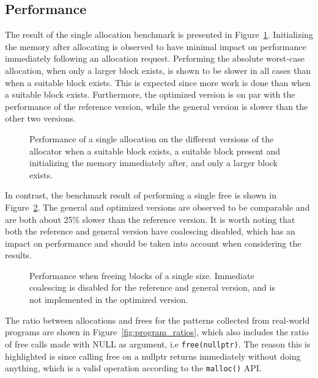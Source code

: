 
\subsection{Performance}
\label{sec:results:performance}

The result of the single allocation benchmark is presented in Figure~\ref{fig:allocation_performance}. Initializing the memory after allocating is observed to have minimal impact on performance immediately following an allocation request. Performing the absolute worst-case allocation, when only a larger block exists, is shown to be slower in all cases than when a suitable block exists. This is expected since more work is done than when a suitable block exists. Furthermore, the optimized version is on par with the performance of the reference version, while the general version is slower than the other two versions. 

\begin{figure}[H]
    \centering
    
    \caption{Performance of a single allocation on the different versions of the allocator when a suitable block exists, a suitable block present and initializing the memory immediately after, and only a larger block exists.}
    \label{fig:allocation_performance}
\end{figure}

In contrast, the benchmark result of performing a single free is shown in Figure~\ref{fig:free_performance}. The general and optimized versions are observed to be comparable and are both about 25\% slower than the reference version. It is worth noting that both the reference and general version have coalescing disabled, which has an impact on performance and should be taken into account when considering the results.

\begin{figure}[H]
    \centering
    
    \caption{Performance when freeing blocks of a single size. Immediate coalescing is disabled for the reference and general version, and is not implemented in the optimized version.}
    \label{fig:free_performance}
\end{figure}

The ratio between allocations and frees for the patterns collected from real-world programs are shown in Figure~\ref{fig:program_ratios}, which also includes the ratio of free calls made with NULL as argument, i.e \texttt{free(nullptr)}. The reason this is highlighted is since calling free on a nullptr returns immediately without doing anything, which is a valid operation according to the \texttt{malloc()} API.

